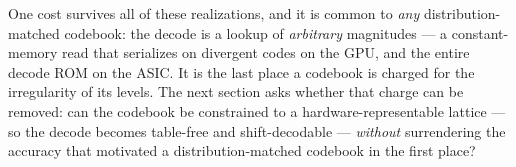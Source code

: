 One cost survives all of these realizations, and it is common to \emph{any}
distribution-matched codebook: the decode is a lookup of \emph{arbitrary}
magnitudes --- a constant-memory read that serializes on divergent codes on the
GPU, and the entire decode ROM on the ASIC. It is the last place a codebook is
charged for the irregularity of its levels. The next section asks whether that
charge can be removed: can the codebook be constrained to a hardware-representable
lattice --- so the decode becomes table-free and shift-decodable --- \emph{without}
surrendering the accuracy that motivated a distribution-matched codebook in the
first place?
